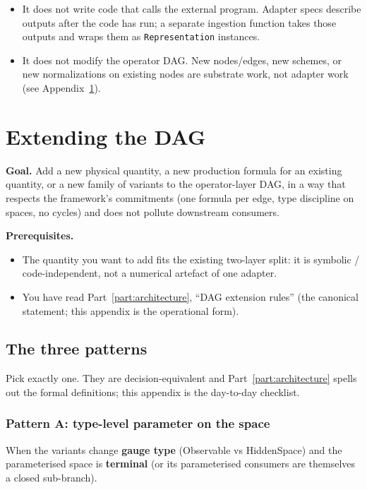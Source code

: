 \documentclass[11pt,a4paper]{article}
\begin{document}
\begin{itemize}[leftmargin=2em]
  \item It does not write code that calls the external program. Adapter specs
        describe outputs after the code has run; a separate ingestion function
        takes those outputs and wraps them as \texttt{Representation} instances.
  \item It does not modify the operator DAG. New nodes/edges, new schemes, or new
        normalizations on existing nodes are substrate work, not adapter work (see
        Appendix~\ref{app:extend}).
\end{itemize}

\section{Extending the DAG}
\label{app:extend}

\noindent\textbf{Goal.} Add a new physical quantity, a new production formula for
an existing quantity, or a new family of variants to the operator-layer DAG, in a
way that respects the framework's commitments (one formula per edge, type
discipline on spaces, no cycles) and does not pollute downstream consumers.

\noindent\textbf{Prerequisites.}
\begin{itemize}[leftmargin=2em]
  \item The quantity you want to add fits the existing two-layer split: it is
        symbolic / code-independent, not a numerical artefact of one adapter.
  \item You have read Part~\ref{part:architecture}, ``DAG extension rules'' (the
        canonical statement; this appendix is the operational form).
\end{itemize}

\subsection{The three patterns}

Pick exactly one. They are decision-equivalent and Part~\ref{part:architecture}
spells out the formal definitions; this appendix is the day-to-day checklist.

\subsubsection*{Pattern A: type-level parameter on the space}

When the variants change \textbf{gauge type} (Observable vs HiddenSpace) and the
parameterised space is \textbf{terminal} (or its parameterised consumers are
themselves a closed sub-branch).
\end{document}
